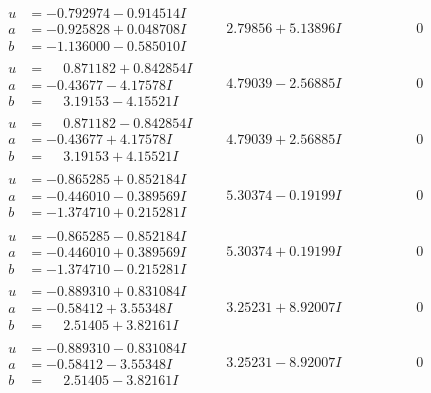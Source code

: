 \documentclass[1p]{elsarticle_modified}
\theoremstyle{definition}
\begin{document}
$$\begin{array}{c|c|c}
\begin{aligned}
u &= -0.792974 - 0.914514 I \\
a &= -0.925828 + 0.048708 I \\
b &= -1.136000 - 0.585010 I\end{aligned}
 & \phantom{-}2.79856 + 5.13896 I & \phantom{-0.000000 } 0 \\ \hline\begin{aligned}
u &= \phantom{-}0.871182 + 0.842854 I \\
a &= -0.43677 - 4.17578 I \\
b &= \phantom{-}3.19153 - 4.15521 I\end{aligned}
 & \phantom{-}4.79039 - 2.56885 I & \phantom{-0.000000 } 0 \\ \hline\begin{aligned}
u &= \phantom{-}0.871182 - 0.842854 I \\
a &= -0.43677 + 4.17578 I \\
b &= \phantom{-}3.19153 + 4.15521 I\end{aligned}
 & \phantom{-}4.79039 + 2.56885 I & \phantom{-0.000000 } 0 \\ \hline\begin{aligned}
u &= -0.865285 + 0.852184 I \\
a &= -0.446010 - 0.389569 I \\
b &= -1.374710 + 0.215281 I\end{aligned}
 & \phantom{-}5.30374 - 0.19199 I & \phantom{-0.000000 } 0 \\ \hline\begin{aligned}
u &= -0.865285 - 0.852184 I \\
a &= -0.446010 + 0.389569 I \\
b &= -1.374710 - 0.215281 I\end{aligned}
 & \phantom{-}5.30374 + 0.19199 I & \phantom{-0.000000 } 0 \\ \hline\begin{aligned}
u &= -0.889310 + 0.831084 I \\
a &= -0.58412 + 3.55348 I \\
b &= \phantom{-}2.51405 + 3.82161 I\end{aligned}
 & \phantom{-}3.25231 + 8.92007 I & \phantom{-0.000000 } 0 \\ \hline\begin{aligned}
u &= -0.889310 - 0.831084 I \\
a &= -0.58412 - 3.55348 I \\
b &= \phantom{-}2.51405 - 3.82161 I\end{aligned}
 & \phantom{-}3.25231 - 8.92007 I & \phantom{-0.000000 } 0 \\ \hline\begin{aligned}

\end{aligned}
\end{array}$$
\end{document}
